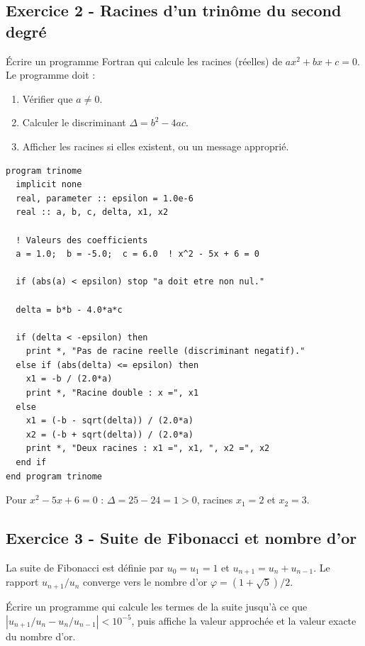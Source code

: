 \documentclass[12pt,a4paper]{article}
\begin{document}
\subsection*{Exercice 2 - Racines d'un trinôme du second degré \niveau{\facile}}

\begin{boiteexercice}
Écrire un programme Fortran qui calcule les racines (réelles) de $ax^2+bx+c=0$. Le programme doit :
\begin{enumerate}
  \item Vérifier que $a\neq0$.
  \item Calculer le discriminant $\Delta = b^2-4ac$.
  \item Afficher les racines si elles existent, ou un message approprié.
\end{enumerate}
\end{boiteexercice}

\begin{boitecorrige}
\begin{lstlisting}
program trinome
  implicit none
  real, parameter :: epsilon = 1.0e-6
  real :: a, b, c, delta, x1, x2

  ! Valeurs des coefficients
  a = 1.0;  b = -5.0;  c = 6.0  ! x^2 - 5x + 6 = 0

  if (abs(a) < epsilon) stop "a doit etre non nul."

  delta = b*b - 4.0*a*c

  if (delta < -epsilon) then
    print *, "Pas de racine reelle (discriminant negatif)."
  else if (abs(delta) <= epsilon) then
    x1 = -b / (2.0*a)
    print *, "Racine double : x =", x1
  else
    x1 = (-b - sqrt(delta)) / (2.0*a)
    x2 = (-b + sqrt(delta)) / (2.0*a)
    print *, "Deux racines : x1 =", x1, ", x2 =", x2
  end if
end program trinome
\end{lstlisting}

Pour $x^2-5x+6=0$ : $\Delta = 25-24=1>0$, racines $x_1=2$ et $x_2=3$.
\end{boitecorrige}

\subsection*{Exercice 3 - Suite de Fibonacci et nombre d'or \niveau{\moyen}}

\begin{boiteexercice}
La suite de Fibonacci est définie par $u_0=u_1=1$ et $u_{n+1}=u_n+u_{n-1}$. Le rapport $u_{n+1}/u_n$ converge vers le nombre d'or $\varphi = (1+\sqrt{5})/2$.

Écrire un programme qui calcule les termes de la suite jusqu'à ce que $|u_{n+1}/u_n - u_n/u_{n-1}| < 10^{-5}$, puis affiche la valeur approchée et la valeur exacte du nombre d'or.
\end{boiteexercice}
\end{document}
